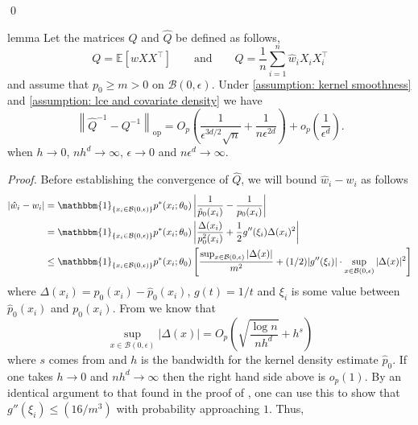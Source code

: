 \documentclass[11pt]{article}
\begin{document}
\qed{}

\begin{restatable}{lemma}{}
    Let the matrices $Q$ and $\hat{Q}$ be defined as follows, 
    \begin{equation}
    Q = \mathbb{E}\left[wXX^{\top}\right] \qquad \text{and} \qquad \hat{Q} = \frac{1}{n}\sum_{i = 1}^n\hat{w}_iX_iX_i^{\top}
    \end{equation}
    and assume that $p_0 \geq m > 0$ on $\mathcal{B}(0, \epsilon)$. Under \cref{assumption: kernel smoothness} and \cref{assumption: lce and covariate density} we have 
    \[\left\|\hat{Q}^{-1} - Q^{-1}\right\|_{\text{op}} = O_p\left(\frac{1}{\epsilon^{3d/2}\sqrt{n}} + \frac{1}{n\epsilon^{2d}}\right) + o_p\left(\frac{1}{\epsilon^d}\right).\]
    when $h \rightarrow 0$, $nh^d \rightarrow \infty$, $\epsilon \rightarrow 0$ and $n\epsilon^d \rightarrow \infty$. 
    \label{lemma: Q convergence}
\end{restatable}
\noindent \textit{Proof.} Before establishing the convergence of $\hat{Q}$, we will bound $\hat{w}_i - w_i$ as follows
\begin{align*}
    |\hat{w}_i - w_i| &= \mathbbm{1}_{\{x_i \in \mathcal{B}(0, \epsilon)\}}p^*(x_i;\theta_0) \left|\frac{1}{\hat{p}_0(x_i)} - \frac{1}{p_0(x_i)}\right| \\
    &=  \mathbbm{1}_{\{x_i \in \mathcal{B}(0, \epsilon)\}}p^*(x_i;\theta_0) \left|\frac{\Delta(x_i)}{p^2_0(x_i)} + \frac{1}{2}g''(\xi_i)\Delta(x_i)^2\right| \\
    &\leq \mathbbm{1}_{\{x_i \in \mathcal{B}(0, \epsilon)\}}p^*(x_i;\theta_0) \left[\frac{ \sup_{x \in \mathcal{B}(0, \epsilon)}|\Delta(x)|}{m^2} + (1/2)|g''(\xi_i)|\cdot \sup_{x \in \mathcal{B}(0, \epsilon)}|\Delta(x)|^2\right]
\end{align*}
where $\Delta(x_i) = p_0(x_i) - \hat{p}_0(x_i)$, $g(t) = 1/t$ and $\xi_i$ is some value between $\hat{p}_0(x_i)$ and $p_0(x_i)$. From  we know that 
\begin{equation}
    \sup_{x \in \mathcal{B}(0, \epsilon)} |\Delta(x)| = O_p\left(\sqrt{\frac{\log n}{nh^d}} + h^s\right)
\end{equation}
where $s$ comes from  and $h$ is the bandwidth for the kernel density estimate $\hat{p}_0$. If one takes $h \rightarrow 0$ and $nh^d \rightarrow \infty$ then the right hand side above is $o_p(1)$. By an identical argument to that found in the proof of , one can use this to show that $g''(\xi_i) \leq (16/m^3)$ with probability approaching $1$. Thus,
\end{document}
